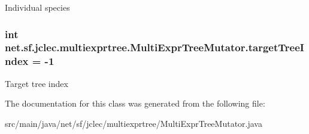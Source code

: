 Individual species \hypertarget{classnet_1_1sf_1_1jclec_1_1multiexprtree_1_1_multi_expr_tree_mutator_a55e0611fff588a766e00685d8a261ae6}{
\subsubsection[{target\-Tree\-Index}]{\setlength{\rightskip}{0pt plus 5cm}int net.\-sf.\-jclec.\-multiexprtree.\-Multi\-Expr\-Tree\-Mutator.\-target\-Tree\-Index = -\/1\hspace{0.3cm}{\ttfamily [protected]}}}\label{classnet_1_1sf_1_1jclec_1_1multiexprtree_1_1_multi_expr_tree_mutator_a55e0611fff588a766e00685d8a261ae6}
Target tree index 

The documentation for this class was generated from the following file\-:\begin{DoxyCompactItemize}
\item 
src/main/java/net/sf/jclec/multiexprtree/Multi\-Expr\-Tree\-Mutator.\-java\end{DoxyCompactItemize}
